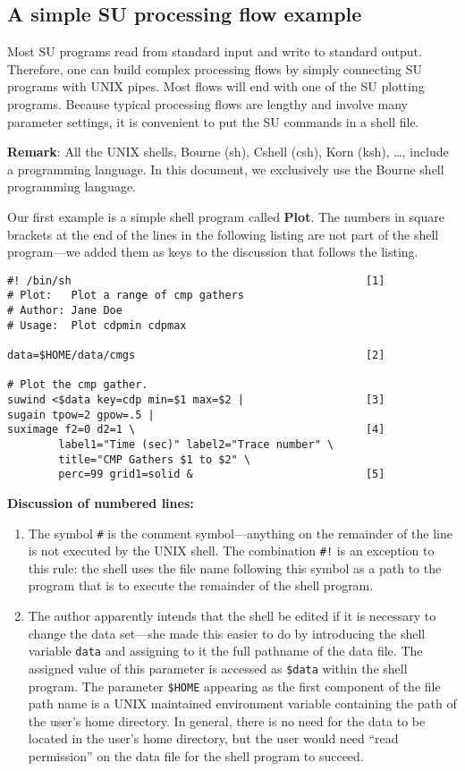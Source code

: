 {{{{{{{\subsection{A simple SU processing flow example\label{SU:sec:Plotshell}}
Most {\small\sf SU} programs read from standard input and write to standard output.
Therefore, one can build complex processing flows by simply
connecting {\small\sf SU} programs with UNIX pipes.
Most flows will end with one of the {\small\sf SU} plotting programs.
Because typical processing flows are lengthy and involve many
parameter settings, it is convenient to put the {\small\sf SU} commands in a
shell file.

{\bf Remark}: All the UNIX shells, Bourne (sh), Cshell (csh),
Korn (ksh), \ldots, include a programming language.  In this document,
we exclusively use the Bourne shell programming language.

Our first example is a simple shell program called {\bf Plot}.
The numbers in square brackets at the
end of the lines in the following listing are not part of the
shell program---we added them as keys to the discussion
that follows the listing.

{\small\begin{verbatim}
#! /bin/sh                                              [1]
# Plot:   Plot a range of cmp gathers
# Author: Jane Doe
# Usage:  Plot cdpmin cdpmax

data=$HOME/data/cmgs                                    [2]

# Plot the cmp gather.
suwind <$data key=cdp min=$1 max=$2 |                   [3]
sugain tpow=2 gpow=.5 |
suximage f2=0 d2=1 \                                    [4]
        label1="Time (sec)" label2="Trace number" \
        title="CMP Gathers $1 to $2" \
        perc=99 grid1=solid &                           [5]
\end{verbatim}}\noindent
{\bf Discussion of numbered lines:}

\begin{enumerate}
\item The symbol \verb:#: is the comment symbol---anything on the remainder
of the line is not executed by the UNIX shell.  The combination
\verb:#!: is an exception to this rule: the shell uses the
file name following
this symbol as a path to the program that is to execute the remainder
of the shell program.

\item The author apparently intends that the shell be edited
if it is necessary to change the data set---she made this easier to
do by introducing the shell variable \verb:data: and assigning
to it the full pathname of the data file.  The assigned value
of this parameter is accessed as \verb:$data: within the shell program.
The parameter \verb:$HOME: appearing as the first component of the file
path name is a UNIX maintained environment variable
containing the path of the user's home directory.  In general,
there is no need for the data to be located in the user's home
directory, but the user would need ``read permission'' on the
data file for the shell program to succeed.


\end{enumerate}}}}}}}}
